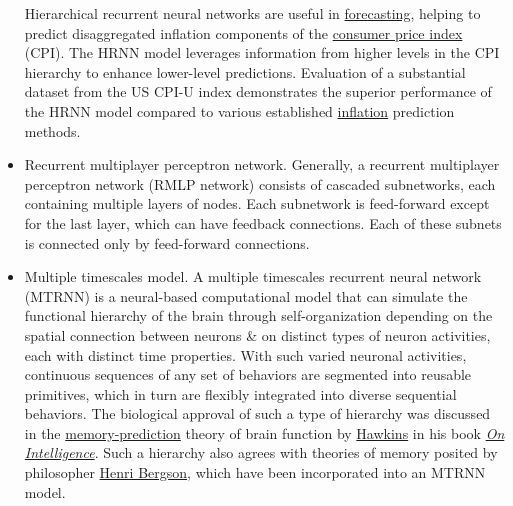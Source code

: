 \documentclass{article}
\begin{document}
\begin{itemize}
	Hierarchical recurrent neural networks are useful in \href{https://en.wikipedia.org/wiki/Forecasting}{forecasting}, helping to predict disaggregated inflation components of the \href{https://en.wikipedia.org/wiki/Consumer_price_index}{consumer price index} (CPI). The HRNN model leverages information from higher levels in the CPI hierarchy to enhance lower-level predictions. Evaluation of a substantial dataset from the US CPI-U index demonstrates the superior performance of the HRNN model compared to various established \href{https://en.wikipedia.org/wiki/Inflation}{inflation} prediction methods.
	\item {\sf Recurrent multiplayer perceptron network.} Generally, a recurrent multiplayer perceptron network (RMLP network) consists of cascaded subnetworks, each containing multiple layers of nodes. Each subnetwork is feed-forward except for the last layer, which can have feedback connections. Each of these subnets is connected only by feed-forward connections.
	\item {\sf Multiple timescales model.} A multiple timescales recurrent neural network (MTRNN) is a neural-based computational model that can simulate the functional hierarchy of the brain through self-organization depending on the spatial connection between neurons \& on distinct types of neuron activities, each with distinct time properties. With such varied neuronal activities, continuous sequences of any set of behaviors are segmented into reusable primitives, which in turn are flexibly integrated into diverse sequential behaviors. The biological approval of such a type of hierarchy was discussed in the \href{https://en.wikipedia.org/wiki/Memory-prediction_framework}{memory-prediction} theory of brain function by \href{https://en.wikipedia.org/wiki/Jeff_Hawkins}{\sc Hawkins} in his book \href{https://en.wikipedia.org/wiki/On_Intelligence}{\it On Intelligence}. Such a hierarchy also agrees with theories of memory posited by philosopher \href{https://en.wikipedia.org/wiki/Henri_Bergson}{\sc Henri Bergson}, which have been incorporated into an MTRNN model.

\end{itemize}
\end{document}
